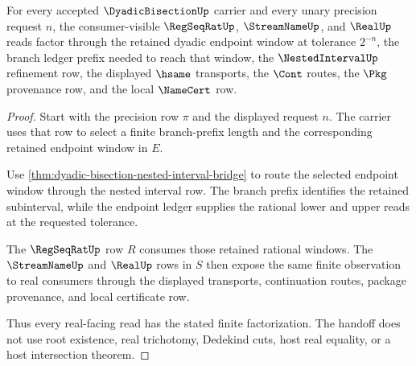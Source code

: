 \begin{theorem}
\label{thm:dyadic-bisection-real-stream-handoff}
For every accepted $\DyadicBisectionUp$ carrier and every unary precision request $n$, the consumer-visible $\RegSeqRatUp$, $\StreamNameUp$, and $\RealUp$ reads factor through the retained dyadic endpoint window at tolerance $2^{-n}$, the branch ledger prefix needed to reach that window, the $\NestedIntervalUp$ refinement row, the displayed $\hsame$ transports, the $\Cont$ routes, the $\Pkg$ provenance row, and the local $\NameCert$ row.
\end{theorem}
\begin{proof}
Start with the precision row $\pi$ and the displayed request $n$. The carrier uses that row to select a finite branch-prefix length and the corresponding retained endpoint window in $E$.

Use \autoref{thm:dyadic-bisection-nested-interval-bridge} to route the selected endpoint window through the nested interval row. The branch prefix identifies the retained subinterval, while the endpoint ledger supplies the rational lower and upper reads at the requested tolerance.

The $\RegSeqRatUp$ row $R$ consumes those retained rational windows. The $\StreamNameUp$ and $\RealUp$ rows in $S$ then expose the same finite observation to real consumers through the displayed transports, continuation routes, package provenance, and local certificate row.

Thus every real-facing read has the stated finite factorization. The handoff does not use root existence, real trichotomy, Dedekind cuts, host real equality, or a host intersection theorem.
\end{proof}

